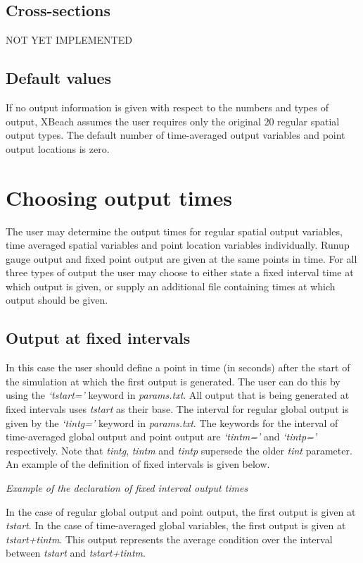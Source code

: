\subsection{ Cross-sections}

NOT YET IMPLEMENTED
\subsection{ Default values}

If no output information is given with respect to the numbers and types of output, XBeach assumes the user requires only the original 20 regular spatial output types. The default number of time-averaged output variables and point output locations is zero.
\section{Choosing output times}

The user may determine the output times for regular spatial output variables, time averaged spatial variables and point location variables individually. Runup gauge output and fixed point output are given at the same points in time. For all three types of output the user may choose to either state a fixed interval time at which output is given, or supply an additional file containing times at which output should be given. 
\subsection{ Output at fixed intervals}

In this case the user should define a point in time (in seconds) after the start of the simulation at which the first output is generated. The user can do this by using the \textit{`tstart='} keyword in \textit{params.txt}. All output that is being generated at fixed intervals uses \textit{tstart} as their base. The interval for regular global output is given by the \textit{`tintg='} keyword in \textit{params.txt}. The keywords for the interval of time-averaged global output and point output are \textit{`tintm='} and \textit{`tintp='} respectively. Note that \textit{tintg}, \textit{tintm} and \textit{tintp} supersede the older \textit{tint} parameter. An example of the definition of fixed intervals is given below.

\textit{Example of the declaration of fixed interval output times}

In the case of regular global output and point output, the first output is given at \textit{tstart}. In the case of time-averaged global variables, the first output is given at \textit{tstart+tintm}. This output represents the average condition over the interval between \textit{tstart} and \textit{tstart+tintm}. 
